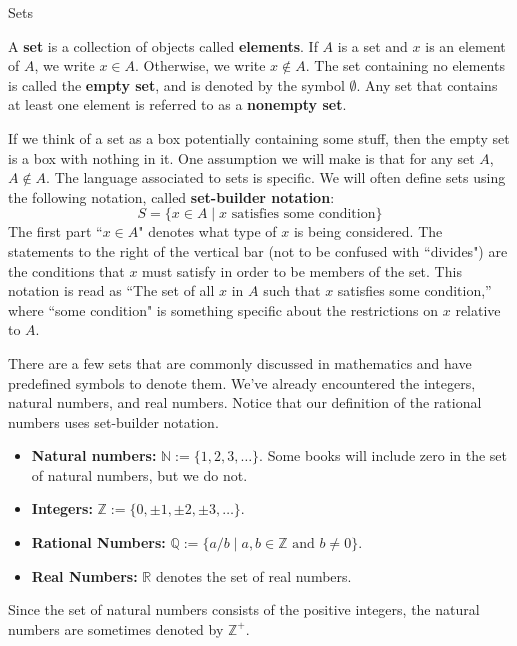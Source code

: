 \begin{section}{Sets}

\begin{definition}
A \textbf{set} is a collection of objects called \textbf{elements}. If $A$ is a set and $x$ is an element of $A$, we write $\boxed{x\in A}$. Otherwise, we write $\boxed{x\notin A}$. The set containing no elements is called the \textbf{empty set}, and is denoted by the symbol $\boxed{\emptyset}$. Any set that contains at least one element is referred to as a \textbf{nonempty set}.
\end{definition}

If we think of a set as a box potentially containing some stuff, then the empty set is a box with nothing in it. One assumption we will make is that for any set $A$, $A\notin A$. The language associated to sets is specific.  We will often define sets using the following notation, called \textbf{set-builder notation}:
\[
\boxed{S=\{x \in A\mid x \mbox{ satisfies some condition}\}}
\]
The first part ``$x \in A$" denotes what type of $x$ is being considered.  The statements to the right of the vertical bar (not to be confused with ``divides") are the conditions that $x$ must satisfy in order to be members of the set.  This notation is read as ``The set of all $x$ in $A$ such that $x$ satisfies some condition,'' where ``some condition" is something specific about the restrictions on $x$ relative to $A$.

There are a few sets that are commonly discussed in mathematics and have predefined symbols to denote them. We've already encountered the integers, natural numbers, and real numbers. Notice that our definition of the rational numbers uses set-builder notation.
\begin{itemize}
\item \textbf{Natural numbers:} $\boxed{\mathbb{N}:=\{1,2,3,\ldots\}}$. Some books will include zero in the set of natural numbers, but we do not.
\item \textbf{Integers:} $\boxed{\mathbb{Z}:=\{0, \pm 1, \pm2, \pm 3, \ldots\}}$.
\item \textbf{Rational Numbers:} $\boxed{\mathbb{Q}:=\{a/b \mid a, b \in \mathbb{Z} \text{ and } b \neq 0\}}$.
\item \textbf{Real Numbers:} $\boxed{\mathbb{R}}$ denotes the set of real numbers.
\end{itemize}
Since the set of natural numbers consists of the positive integers, the natural numbers are sometimes denoted by $\mathbb{Z}^+$.


\end{section}
